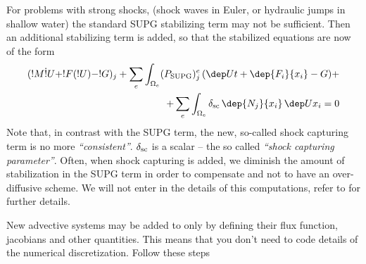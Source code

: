 For problems with strong shocks, (shock waves in Euler, or hydraulic
jumps in shallow water) the standard SUPG stabilizing term may not be
sufficient. Then an additional stabilizing term is added, so that the
stabilized equations are now of the form
%
\begin{equation} 
\begin{split}
   (!M \dot !U + !F(!U) - !G)_j
       + \sum_e \int_{\Omega_e} (\Psupg)^e_j \, (\dep Ut+\dep
       {F_i}{x_i} -G) +\\
       + \sum_e \int_{\Omega_e} \deltasc \, \dep{N_j}{x_i} \, \dep U{x_i} = 0
\end{split}
\end{equation}
%
Note that, in contrast with the SUPG term, the new, so-called shock
capturing term is no more \emph{``consistent''}. ${\delta_\mathrm{sc}}$ is a
scalar -- the so called \emph{``shock capturing parameter''}. Often,
when shock capturing is added, we diminish the amount of stabilization
in the SUPG term in order to compensate and not to have an
over-diffusive scheme. We will not enter in the details of this
computations, refer to \cite{HM_86B} for further details. 


New advective systems may be added to \pfem{} only by defining their
flux function, jacobians and other quantities. This means that you
don't need to code details of the numerical discretization. Follow
these steps

